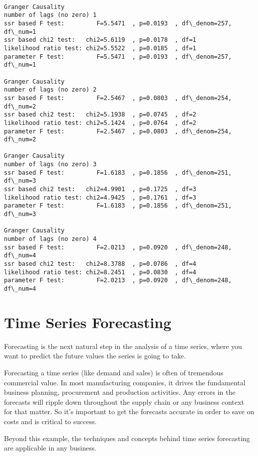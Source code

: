 \documentclass[11pt]{article}
\begin{document}
    \begin{Verbatim}[commandchars=\\\{\}]

Granger Causality
number of lags (no zero) 1
ssr based F test:         F=5.5471  , p=0.0193  , df\_denom=257, df\_num=1
ssr based chi2 test:   chi2=5.6119  , p=0.0178  , df=1
likelihood ratio test: chi2=5.5522  , p=0.0185  , df=1
parameter F test:         F=5.5471  , p=0.0193  , df\_denom=257, df\_num=1

Granger Causality
number of lags (no zero) 2
ssr based F test:         F=2.5467  , p=0.0803  , df\_denom=254, df\_num=2
ssr based chi2 test:   chi2=5.1938  , p=0.0745  , df=2
likelihood ratio test: chi2=5.1424  , p=0.0764  , df=2
parameter F test:         F=2.5467  , p=0.0803  , df\_denom=254, df\_num=2

Granger Causality
number of lags (no zero) 3
ssr based F test:         F=1.6183  , p=0.1856  , df\_denom=251, df\_num=3
ssr based chi2 test:   chi2=4.9901  , p=0.1725  , df=3
likelihood ratio test: chi2=4.9425  , p=0.1761  , df=3
parameter F test:         F=1.6183  , p=0.1856  , df\_denom=251, df\_num=3

Granger Causality
number of lags (no zero) 4
ssr based F test:         F=2.0213  , p=0.0920  , df\_denom=248, df\_num=4
ssr based chi2 test:   chi2=8.3788  , p=0.0786  , df=4
likelihood ratio test: chi2=8.2451  , p=0.0830  , df=4
parameter F test:         F=2.0213  , p=0.0920  , df\_denom=248, df\_num=4
    \end{Verbatim}

    \hypertarget{time-series-forecasting}{%
\section{Time Series Forecasting}\label{time-series-forecasting}}

Forecasting is the next natural step in the analysis of a time series,
where you want to predict the future values the series is going to take.

Forecasting a time series (like demand and sales) is often of tremendous
commercial value. In most manufacturing companies, it drives the
fundamental business planning, procurement and production activities.
Any errors in the forecasts will ripple down throughout the supply chain
or any business context for that matter. So it's important to get the
forecasts accurate in order to save on costs and is critical to success.

Beyond this example, the techniques and concepts behind time series
forecasting are applicable in any business.
\end{document}
